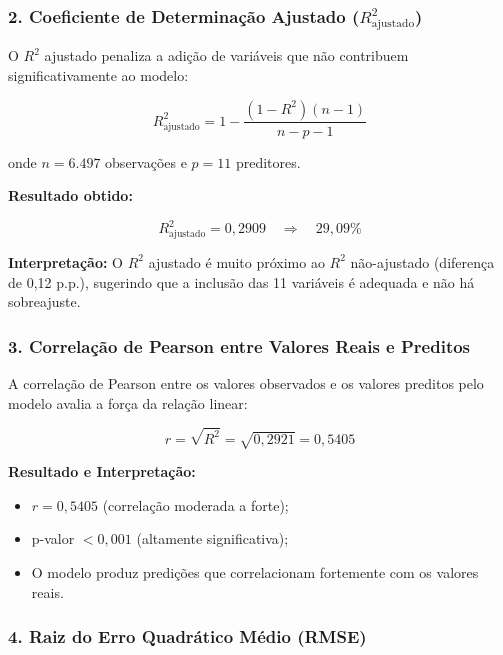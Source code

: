 \documentclass[12pt,a4paper]{article}
\begin{document}
\subsubsection*{2. Coeficiente de Determinação Ajustado ($R^2_{\text{ajustado}}$)}

O $R^2$ ajustado penaliza a adição de variáveis que não contribuem significativamente ao modelo:

\begin{equation}
R^2_{\text{ajustado}} = 1 - \frac{(1 - R^2)(n-1)}{n - p - 1}
\end{equation}

\noindent onde $n = 6.497$ observações e $p = 11$ preditores.

\textbf{Resultado obtido:}

\begin{equation}
R^2_{\text{ajustado}} = 0,2909 \quad \Rightarrow \quad \boxed{29,09\%}
\end{equation}

\textbf{Interpretação:} O $R^2$ ajustado é muito próximo ao $R^2$ não-ajustado (diferença de 0,12 p.p.), sugerindo que a inclusão das 11 variáveis é adequada e não há sobreajuste.

\subsubsection*{3. Correlação de Pearson entre Valores Reais e Preditos}

A correlação de Pearson entre os valores observados e os valores preditos pelo modelo avalia a força da relação linear:

\begin{equation}
r = \sqrt{R^2} = \sqrt{0,2921} = 0,5405
\end{equation}

\textbf{Resultado e Interpretação:}

\begin{itemize}
  \item $r = 0,5405$ (correlação moderada a forte);
  \item p-valor $< 0,001$ (altamente significativa);
  \item O modelo produz predições que correlacionam fortemente com os valores reais.
\end{itemize}

\subsubsection*{4. Raiz do Erro Quadrático Médio (RMSE)}
\end{document}
